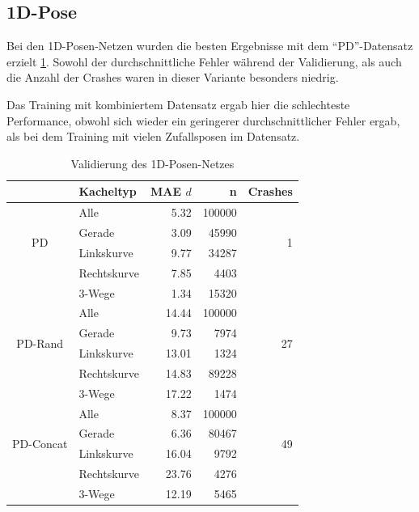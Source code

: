 \subsection{1D-Pose}

Bei den 1D-Posen-Netzen wurden die besten Ergebnisse mit dem ``PD''-Datensatz erzielt \ref{1d-validation}. Sowohl der durchschnittliche Fehler während der Validierung, als auch die Anzahl der Crashes waren in dieser Variante besonders niedrig.

Das Training mit kombiniertem Datensatz ergab hier die schlechteste Performance, obwohl sich wieder ein geringerer durchschnittlicher Fehler ergab, als bei dem Training mit vielen Zufallsposen im Datensatz.

\begin{table}[H]
	\centering
	\begin{tabular}[t]{|c|l|r|r|r|}
		\hline
		& \textbf{Kacheltyp} & \textbf{MAE $d$} & \textbf{n} & Crashes \\
		\hline
		\multirow{4}{*}{PD} 
		& Alle
		& 5.32
		& 100000
		& \multirow{4}{*}{1}\\
		\cline{2-4}
		& Gerade
		&  3.09
		& 45990
		&\\
		\cline{2-4}
		& Linkskurve
		& 9.77
		& 34287
		&\\
		\cline{2-4}
		& Rechtskurve
		& 7.85
		& 4403
		&\\
		\cline{2-4}
		& 3-Wege
		&  1.34
		& 15320
		&\\
		\hline
		\multirow{4}{*}{PD-Rand} 
		& Alle
		& 14.44
		& 100000
		& \multirow{4}{*}{27}\\
		\cline{2-4}
		& Gerade
		&  9.73
		& 7974
		& \\
		\cline{2-4}
		& Linkskurve
		& 13.01
		& 1324
		&\\
		\cline{2-4}
		& Rechtskurve
		& 14.83
		& 89228
		&\\
		\cline{2-4}
		& 3-Wege
		& 17.22
		& 1474
		&\\
		\hline
		\multirow{4}{*}{PD-Concat} 
		& Alle
		& 8.37
		& 100000
		& \multirow{4}{*}{49}\\
		\cline{2-4}
		& Gerade
		& 6.36
		& 80467
		&\\
		\cline{2-4}
		& Linkskurve
		& 16.04
		& 9792
		&\\
		\cline{2-4}
		& Rechtskurve
		& 23.76
		& 4276
		&\\
		\cline{2-4}
		& 3-Wege
		& 12.19
		& 5465
		&\\
		\hline
	\end{tabular}
	\caption{Validierung des 1D-Posen-Netzes}
	\label{1d-validation}
\end{table}

